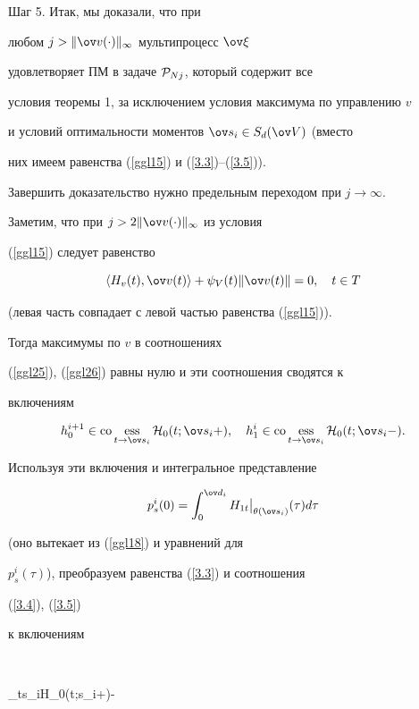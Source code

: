 Шаг 5. Итак, мы доказали, что при


любом $j>\|\ov v(\cdot)\|_\infty$ мультипроцесс $\ov\xi$


удовлетворяет ПМ в задаче ${\cal P}_{Nj}$, который содержит все


условия теоремы 1, за исключением условия максимума по управлению $v$


и условий оптимальности моментов $\ov s_i\in S_d(\ov V)$ (вместо


них имеем равенства (\ref{ggl15}) и (\ref{3.3})--(\ref{3.5})).


Завершить доказательство нужно предельным переходом при $j\rightarrow


\infty$.





Заметим, что при $j>2\|\ov v(\cdot)\|_\infty$ из условия


(\ref{ggl15}) следует равенство


$$


\la H_v(t),\ov v(t)\ra+\psi_V(t)\|\ov v(t)\|=0, \quad t\in T


$$


(левая часть совпадает с левой частью равенства (\ref{ggl15})).


Тогда максимумы по $v$ в соотношениях


(\ref{ggl25}), (\ref{ggl26}) равны нулю и эти соотношения сводятся к


включениям


$$


h_0^{i+1}\in\co\ess_{t\rightarrow \ov s_i}{\cal H}_0(t;\ov s_i+),\quad


h_1^{i}\in \co\ess_{t\rightarrow \ov s_i}{\cal H}_0(t;\ov s_i-).


$$


Используя эти включения и интегральное представление


$$


p_s^i(0)=\int_0^{\ov d_i}H_{1t}\big|_{\theta(\ov s_i)}(\tau)d\tau


$$


(оно вытекает из (\ref{ggl18}) и уравнений для


$p_s^i(\tau)$), преобразуем равенства (\ref{3.3}) и соотношения


(\ref{3.4}), (\ref{3.5})


к включениям


$$


\co\ess_{t\rightarrow \ov s_i}{\cal H}_0(t;\ov s_i+)-


